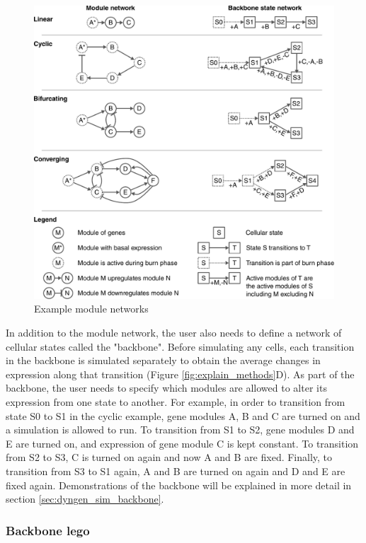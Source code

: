 \begin{figure}[htb!]
	\centering
	\includegraphics[width=\LARGEfigure]{fig/example_backbones} 
	\caption{Example module networks}
	\label{fig:example_backbones}
\end{figure}

In addition to the module network, the user also needs to define a network of cellular states called the "backbone". Before simulating any cells, each transition in the backbone is simulated separately to obtain the average changes in expression along that transition (Figure \ref{fig:explain_methods}D). As part of the backbone, the user needs to specify which modules are allowed to alter its expression from one state to another. For example, in order to transition from state S0 to S1 in the cyclic example, gene modules A, B and C are turned on and a simulation is allowed to run. To transition from S1 to S2, gene modules D and E are turned on, and expression of gene module C is kept constant. To transition from S2 to S3, C is turned on again and now A and B are fixed. Finally, to transition from S3 to S1 again, A and B are turned on again and D and E are fixed again. Demonstrations of the backbone will be explained in more detail in section \ref{sec:dyngen_sim_backbone}.

\subsubsection{Backbone lego} \label{sec:dyngen_backbone_lego}

